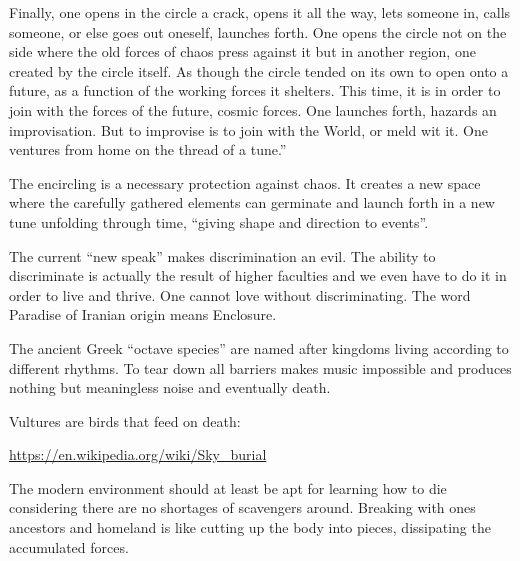 \begin{footnotesize}
\begin{sffamily}
Finally, one opens in the circle a crack, opens it all the way, lets someone in, calls someone, or else goes out oneself, launches forth. One opens the circle not on the side where the old forces of chaos press against it but in another region, one created by the circle itself. As though the circle tended on its own to open onto a future, as a function of the working forces it shelters. This time, it is in order to join with the forces of the future, cosmic forces. One launches forth, hazards an improvisation. But to improvise is to join with the World, or meld wit it. One ventures from home on the thread of a tune.''

The encircling is a necessary protection against chaos. It creates a new space where the carefully gathered elements can germinate and launch forth in a new tune unfolding through time, ``giving shape and direction to events''.

The current ``new speak'' makes discrimination an evil. The ability to discriminate is actually the result of higher faculties and we even have to do it in order to live and thrive. One cannot love without discriminating. The word Paradise of Iranian origin means Enclosure.

The ancient Greek ``octave species'' are named after kingdoms living according to different rhythms. To tear down all barriers makes music impossible and produces nothing but meaningless noise and eventually death.

Vultures are birds that feed on death:

\url{https://en.wikipedia.org/wiki/Sky\_burial}

The modern environment should at least be apt for learning how to die considering there are no shortages of scavengers around. Breaking with ones ancestors and homeland is like cutting up the body into pieces, dissipating the accumulated forces.


\hfill

\end{sffamily}
\end{footnotesize}

